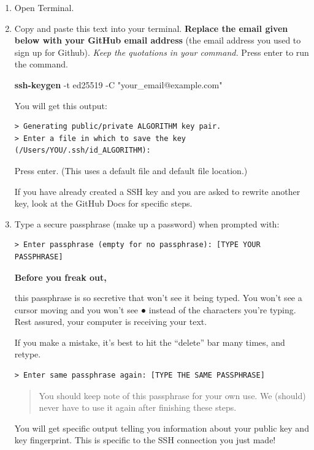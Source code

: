 \documentclass[
]{book}
\newenvironment{Shaded}{\begin{snugshade}}{\end{snugshade}}
\newcommand{\AttributeTok}[1]{\textcolor[rgb]{0.13,0.29,0.53}{#1}}
\newcommand{\FunctionTok}[1]{\textcolor[rgb]{0.13,0.29,0.53}{\textbf{#1}}}
\newcommand{\NormalTok}[1]{#1}
\newcommand{\StringTok}[1]{\textcolor[rgb]{0.31,0.60,0.02}{#1}}
\newenvironment{redbox}{
  \definecolor{shadecolor}{RGB}{243, 154, 157}
  \color{white}
  \begin{shaded}}
 {\end{shaded}}
\theoremstyle{definition}
\theoremstyle{definition}
\theoremstyle{definition}
\theoremstyle{definition}
\theoremstyle{remark}
\begin{document}
\begin{enumerate}
\def\labelenumi{\arabic{enumi}.}
\item
  Open Terminal.
\item
  Copy and paste this text into your terminal. \textbf{Replace the email given below with your GitHub email address} (the email address you used to sign up for Github). \emph{Keep the quotations in your command.} Press enter to run the command.

\begin{Shaded}
\begin{Highlighting}[]
\FunctionTok{ssh{-}keygen} \AttributeTok{{-}t}\NormalTok{ ed25519 }\AttributeTok{{-}C} \StringTok{"your\_email@example.com"}
\end{Highlighting}
\end{Shaded}

  You will get this output:

\begin{verbatim}
> Generating public/private ALGORITHM key pair.
> Enter a file in which to save the key (/Users/YOU/.ssh/id_ALGORITHM):
\end{verbatim}

  Press enter. (This uses a default file and default file location.)

  If you have already created a SSH key and you are asked to rewrite another key, look at the GitHub Docs for specific steps.
\item
  Type a secure passphrase (make up a password) when prompted with:

\begin{verbatim}
> Enter passphrase (empty for no passphrase): [TYPE YOUR PASSPHRASE]
\end{verbatim}

  \begin{redbox}

  \begin{center}
  \textbf{Before you freak out,}

  \end{center}

  this passphrase is so secretive that won't see it being typed. You won't see a cursor moving and you won't see ● instead of the characters you're typing. Rest assured, your computer is receiving your text.

  If you make a mistake, it's best to hit the ``delete'' bar many times, and retype.

  \end{redbox}

\begin{verbatim}
> Enter same passphrase again: [TYPE THE SAME PASSPHRASE]
\end{verbatim}

  \begin{quote}
  You should keep note of this passphrase for your own use. We (should) never have to use it again after finishing these steps.
  \end{quote}

  You will get specific output telling you information about your public key and key fingerprint. This is specific to the SSH connection you just made!
\end{enumerate}
\end{document}
